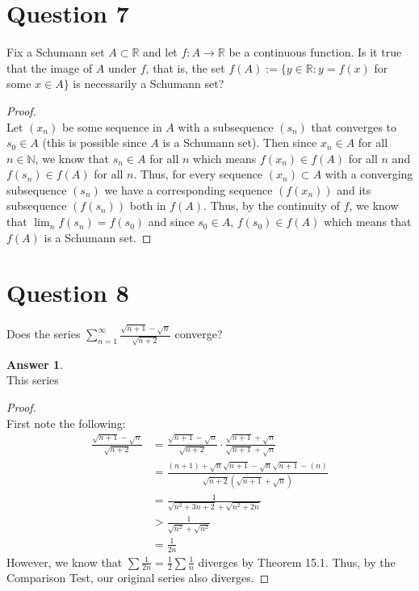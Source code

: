 \documentclass[10pt,a4paper]{article}
\theoremstyle{definition}
\newtheorem*{answer*}{Answer}
\begin{document}
\newpage

\section*{Question 7}
Fix a Schumann set $A \subset \mathbb{R}$ and let $f: A \to \mathbb{R}$ be a continuous function. Is it true that the image of $A$ under $f$, that is, the set $f(A) := \{y \in \mathbb{R}: y = f(x)$ for some $x \in A \}$ is necessarily a Schumann set?


\begin{proof}{$ $}
\\Let $(x_n)$ be some sequence in $A$ with a subsequence $(s_n)$ that converges to $s_0 \in A$ (this is possible since $A$ is a Schumann set). Then since $x_n \in A$ for all $n \in \mathbb{N}$, we know that $s_n \in A$ for all $n$ which means $f(x_n) \in f(A)$ for all $n$ and $f(s_n) \in f(A)$ for all $n$. Thus, for every sequence $(x_n) \subset A$ with a converging subsequence $(s_n)$ we have a corresponding sequence $(f(x_n))$ and its subsequence $(f(s_n))$ both in $f(A)$. Thus, by the continuity of $f$, we know that $\lim_n f(s_n) = f(s_0)$ and since $s_0 \in A$, $f(s_0) \in f(A)$ which means that $f(A)$ is a Schumann set. 
\end{proof}

\newpage

\section*{Question 8}
Does the series $\displaystyle \sum_{n = 1}^{\infty} \frac{\sqrt{n + 1} - \sqrt{n}}{\sqrt{n + 2}}$ converge?

\begin{answer*}{$ $}
\\This series 
\end{answer*}

\begin{proof}{$ $}
\\First note the following:
\begin{align*}
\frac{\sqrt{n + 1} - \sqrt{n}}{\sqrt{n + 2}} &= \frac{\sqrt{n + 1} - \sqrt{n}}{\sqrt{n + 2}} \cdot \frac{\sqrt{n + 1} + \sqrt{n}}{\sqrt{n + 1} + \sqrt{n}}\\
&= \frac{(n + 1) + \sqrt{n}\sqrt{n + 1} - \sqrt{n}\sqrt{n + 1} - (n)}{\sqrt{n + 2}(\sqrt{n + 1} + \sqrt{n})}\\
&= \frac{1}{\sqrt{n^2 + 3n + 2} + \sqrt{n^2 + 2n}}\\
&> \frac{1}{\sqrt{n^2} + \sqrt{n^2}}\\
&= \frac{1}{2n}
\end{align*}
However, we know that $\sum \frac{1}{2n} = \frac{1}{2} \sum \frac{1}{n}$ diverges by Theorem 15.1. Thus, by the Comparison Test, our original series also diverges. 
\end{proof}
\end{document}
